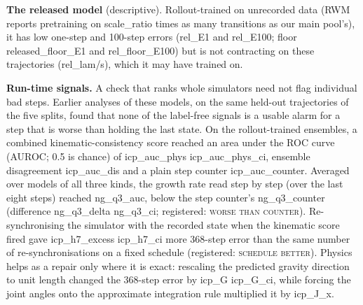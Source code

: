 \textbf{The released model} (descriptive). Rollout-trained on unrecorded data (RWM reports pretraining on {{scale_ratio}} times as many
transitions as our main pool's), it has low one-step
and 100-step errors ({{rel_E1}} and {{rel_E100}}; floor {{released_floor_E1}} and {{rel_floor_E100}}) but is not
contracting on these trajectories ({{rel_lam}}/s), which it may have trained on.

\textbf{Run-time signals.} A check that ranks whole simulators need not flag individual bad steps. Earlier analyses of these models, on
the same held-out trajectories of the five splits, found that none of the label-free signals is a usable alarm for a
step that is worse than holding the last state. On the rollout-trained ensembles, a combined kinematic-consistency
score reached an area under the ROC curve (AUROC; 0.5 is chance) of {{icp_auc_phys}} {{icp_auc_phys_ci}}, ensemble
disagreement {{icp_auc_dis}} and a plain step counter {{icp_auc_counter}}. Averaged over models of all three kinds, the growth
rate read step by step (over the last eight steps) reached {{ng_q3_auc}}, below the step counter's {{ng_q3_counter}}
(difference {{ng_q3_delta}} {{ng_q3_ci}}; registered: \textsc{worse than counter}). Re-synchronising the simulator with the recorded state when the
kinematic score fired gave {{icp_h7_excess}} {{icp_h7_ci}} more 368-step error than the same number of
re-synchronisations on a fixed schedule (registered: \textsc{schedule better}). Physics helps as a repair only where it is exact: rescaling the predicted
gravity direction to unit length changed the 368-step error by {{icp_G}} {{icp_G_ci}}, while forcing the joint
angles onto the approximate integration rule multiplied it by {{icp_J_x}}.

\FloatBarrier
